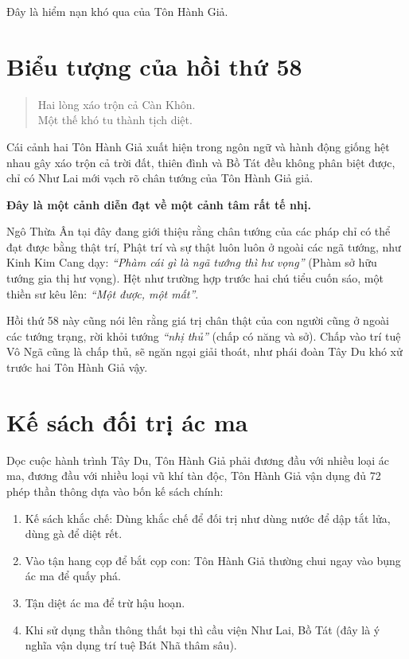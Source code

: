 Đây là hiểm nạn khó qua của Tôn Hành Giả.

\section{Biểu tượng của hồi thứ 58} %
\label{sec:bieu_tuong_hoi_58}

\begin{verse}
\begin{itshape}
Hai lòng xáo trộn cả Càn Khôn.\\
Một thế khó tu thành tịch diệt.
\end{itshape}
\end{verse}

Cái cảnh hai Tôn Hành Giả xuất hiện trong ngôn ngữ và hành động giống hệt nhau gây xáo trộn cả trời đất, thiên đình và Bồ Tát đều không phân biệt được, chỉ có Như Lai mới vạch rõ chân tướng của Tôn Hành Giả giả.

{\bf Đây là một cảnh diễn đạt về một cảnh tâm rất tế nhị.}

Ngô Thừa Ân tại đây đang giới thiệu rằng chân tướng của các pháp chỉ có thể đạt được bằng thật trí, Phật trí và sự thật luôn luôn ở ngoài các ngã tướng, như Kinh Kim Cang dạy: \emph{``Phàm cái gì là ngã tướng thì hư vọng''} (Phàm sở hữu tướng gia thị hư vọng). Hệt như trường hợp trước hai chú tiểu cuốn sáo, một thiền sư kêu lên: \emph{``Một được, một mất''}.

Hồi thứ 58 này cũng nói lên rằng giá trị chân thật của con người cũng ở ngoài các tướng trạng, rời khỏi tướng \emph{``nhị thủ''} (chấp có năng và sở). Chấp vào trí tuệ Vô Ngã cũng là chấp thủ, sẽ ngăn ngại giải thoát, như phái đoàn Tây Du khó xử trước hai Tôn Hành Giả vậy.

\section{Kế sách đối trị ác ma} %
\label{sec:ke_sach_doi_tri_ac_ma}

Dọc cuộc hành trình Tây Du, Tôn Hành Giả phải đương đầu với nhiều loại ác ma, đương đầu với nhiều loại vũ khí tàn độc, Tôn Hành Giả vận dụng đủ 72 phép thần thông dựa vào bốn kế sách chính:

\begin{enumerate}[label=\itshape\arabic*\upshape/]
    \item Kế sách khắc chế: Dùng khắc chế để đối trị như dùng nước để dập tắt lửa, dùng gà để diệt rết.

    \item Vào tận hang cọp để bắt cọp con: Tôn Hành Giả thường chui ngay vào bụng ác ma để quấy phá.

    \item Tận diệt ác ma để trừ hậu hoạn.

    \item Khi sử dụng thần thông thất bại thì cầu viện Như Lai, Bồ Tát (đây là ý nghĩa vận dụng trí tuệ Bát Nhã thâm sâu).
\end{enumerate}

